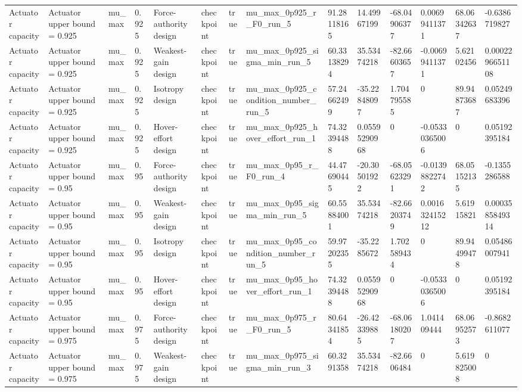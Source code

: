 \begin{tabular}{@{}llllllllllllll@{}}
Actuator capacity & Actuator upper bound = 0.925 & mu\_max & 0.925 & Force-authority design & checkpoint & true & mu\_max\_0p925\_r\_F0\_run\_5 & 91.28118165 & 14.49967199 & -68.04906377 & 0.00699411371 & 68.06342637 & -0.6386719827 \\
Actuator capacity & Actuator upper bound = 0.925 & mu\_max & 0.925 & Weakest-gain design & checkpoint & true & mu\_max\_0p925\_sigma\_min\_run\_5 & 60.33138294 & 35.53474218 & -82.66603657 & -0.00699411371 & 5.62102456 & 0.0002296651108 \\
Actuator capacity & Actuator upper bound = 0.925 & mu\_max & 0.925 & Isotropy design & checkpoint & true & mu\_max\_0p925\_condition\_number\_run\_5 & 57.24662499 & -35.22848097 & 1.704795585 & 0 & 89.94873687 & 0.05249683396 \\
Actuator capacity & Actuator upper bound = 0.925 & mu\_max & 0.925 & Hover-effort design & checkpoint & true & mu\_max\_0p925\_hover\_effort\_run\_1 & 74.32394488 & 0.05595290968 & 0 & -0.05330365006 & 0 & 0.05192395184 \\
Actuator capacity & Actuator upper bound = 0.95 & mu\_max & 0.95 & Force-authority design & checkpoint & true & mu\_max\_0p95\_r\_F0\_run\_4 & 44.47690445 & -20.30501922 & -68.05623291 & -0.01398822742 & 68.05152135 & -0.1355286588 \\
Actuator capacity & Actuator upper bound = 0.95 & mu\_max & 0.95 & Weakest-gain design & checkpoint & true & mu\_max\_0p95\_sigma\_min\_run\_5 & 60.55884001 & 35.53474218 & -82.66203749 & 0.001632415212 & 5.61915821 & 0.0003585849314 \\
Actuator capacity & Actuator upper bound = 0.95 & mu\_max & 0.95 & Isotropy design & checkpoint & true & mu\_max\_0p95\_condition\_number\_run\_5 & 59.97202355 & -35.2285672 & 1.702589434 & 0 & 89.94499478 & 0.05486007941 \\
Actuator capacity & Actuator upper bound = 0.95 & mu\_max & 0.95 & Hover-effort design & checkpoint & true & mu\_max\_0p95\_hover\_effort\_run\_1 & 74.32394488 & 0.05595290968 & 0 & -0.05330365006 & 0 & 0.05192395184 \\
Actuator capacity & Actuator upper bound = 0.975 & mu\_max & 0.975 & Force-authority design & checkpoint & true & mu\_max\_0p975\_r\_F0\_run\_5 & 80.64341854 & -26.42339885 & -68.06180207 & 1.041409444 & 68.06952573 & -0.8682611077 \\
Actuator capacity & Actuator upper bound = 0.975 & mu\_max & 0.975 & Weakest-gain design & checkpoint & true & mu\_max\_0p975\_sigma\_min\_run\_3 & 60.3291358 & 35.53474218 & -82.6606484 & 0 & 5.619825008 & 0 \\

\end{tabular}
